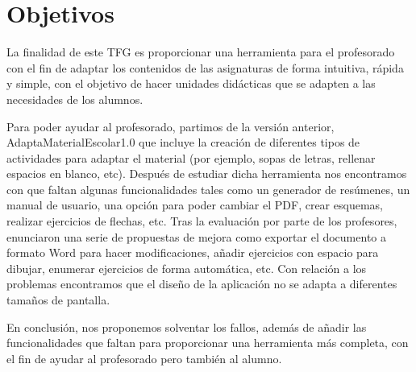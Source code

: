 \section{Objetivos}
La finalidad de este TFG es proporcionar una herramienta para el profesorado con el fin de adaptar los contenidos de las asignaturas de forma intuitiva, rápida y simple, con el objetivo de hacer unidades didácticas que se adapten a las necesidades de los alumnos.

Para poder ayudar al profesorado, partimos de la versión anterior, AdaptaMaterialEscolar1.0 que incluye la creación de diferentes tipos de actividades para adaptar el material (por ejemplo, sopas de letras, rellenar espacios en blanco, etc). Después de estudiar dicha herramienta nos encontramos con que faltan algunas funcionalidades tales como un generador de resúmenes, un manual de usuario, una opción para poder cambiar el PDF, crear esquemas, realizar ejercicios de flechas, etc. Tras la evaluación por parte de los profesores, enunciaron una serie de propuestas de mejora como exportar el documento a formato Word para hacer modificaciones, añadir ejercicios con espacio para dibujar, enumerar ejercicios de forma automática, etc. Con relación a los problemas encontramos que el diseño de la aplicación no se adapta a diferentes tamaños de pantalla.

En conclusión, nos proponemos solventar los fallos, además de añadir las funcionalidades que faltan para proporcionar una herramienta más completa, con el fin de ayudar al profesorado pero también al alumno.

